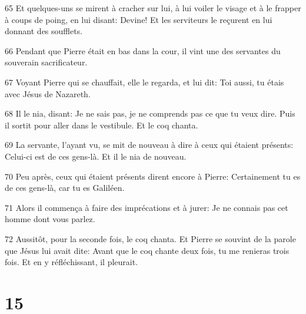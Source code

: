 \par 65 Et quelques-uns se mirent à cracher sur lui, à lui voiler le visage et à le frapper à coups de poing, en lui disant: Devine! Et les serviteurs le reçurent en lui donnant des soufflets.
\par 66 Pendant que Pierre était en bas dans la cour, il vint une des servantes du souverain sacrificateur.
\par 67 Voyant Pierre qui se chauffait, elle le regarda, et lui dit: Toi aussi, tu étais avec Jésus de Nazareth.
\par 68 Il le nia, disant: Je ne sais pas, je ne comprends pas ce que tu veux dire. Puis il sortit pour aller dans le vestibule. Et le coq chanta.
\par 69 La servante, l'ayant vu, se mit de nouveau à dire à ceux qui étaient présents: Celui-ci est de ces gens-là. Et il le nia de nouveau.
\par 70 Peu après, ceux qui étaient présents dirent encore à Pierre: Certainement tu es de ces gens-là, car tu es Galiléen.
\par 71 Alors il commença à faire des imprécations et à jurer: Je ne connais pas cet homme dont vous parlez.
\par 72 Aussitôt, pour la seconde fois, le coq chanta. Et Pierre se souvint de la parole que Jésus lui avait dite: Avant que le coq chante deux fois, tu me renieras trois fois. Et en y réfléchissant, il pleurait.

\chapter{15}

